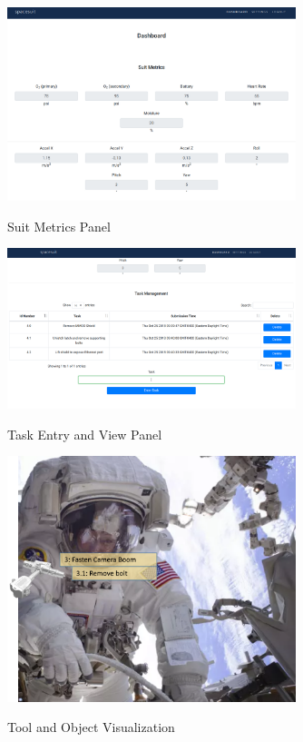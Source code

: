 \documentclass{article}
\begin{document}
\begin{figure}[!htb]
  \centering
  \caption{Suit Metrics Panel}
  \includegraphics[width=0.75\textwidth]{assets/groundcontrolsuitmetrics.png}
  \label{fig:groundcontrolsuitmetrics}
\end{figure}

\begin{figure}[!htb]
  \centering
  \caption{Task Entry and View Panel}
  \includegraphics[width=0.75\textwidth]{assets/taskmanagment.png}
  \label{fig:taskmanagment}
\end{figure}

\begin{figure}[!htb]
  \centering
  \caption{Tool and Object Visualization}
  \includegraphics[width=0.75\textwidth]{assets/subtask.png}
  \label{fig:subtask}
\end{figure}
\end{document}
